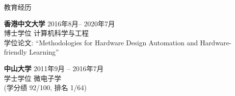 \begin{rSection}{教育经历}

{\bf 香港中文大学} \hfill { 2016年8月-- 2020年7月}\\
博士学位 \quad 计算机科学与工程 \\
学位论文: ``Methodologies for Hardware Design Automation and Hardware-friendly Learning''

{\bf 中山大学} \hfill { 2011年9月 -- 2016年7月}\\
学士学位 \quad 微电子学 \\
(学分绩 92/100, 排名 1/64) 
\end{rSection}
